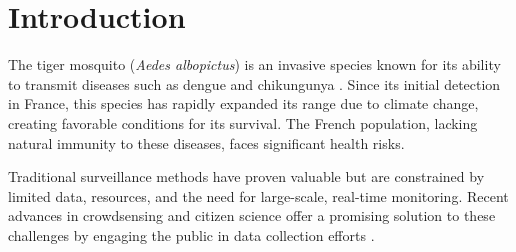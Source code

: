 \maketitle

\section{Introduction}
The tiger mosquito (\textit{Aedes albopictus}) is an invasive species known for its ability to transmit diseases such as dengue and chikungunya \cite{BONIZZONI2013460}.
Since its initial detection in France, this species has rapidly expanded its range due to climate change, creating favorable conditions for its survival. 
The French population, lacking natural immunity to these diseases, faces significant health risks.

Traditional surveillance methods have proven valuable but are constrained by limited data, resources, and the need for large-scale, real-time monitoring. 
Recent advances in crowdsensing and citizen science offer a promising solution to these challenges by engaging the public in data collection efforts \cite{Sousa-2022}.
